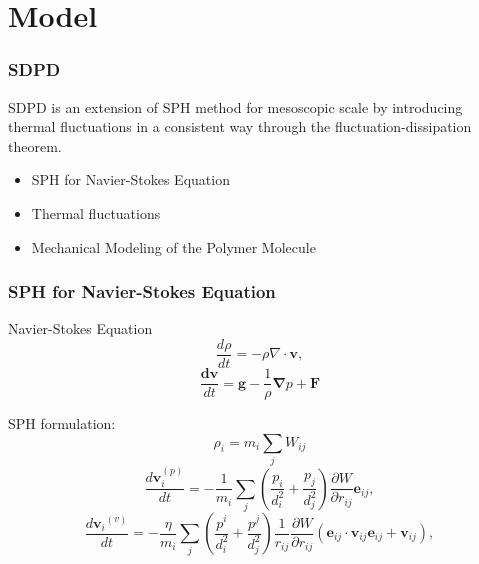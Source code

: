 \section[Model]{Model}
\begin{frame}
  \frametitle{SDPD}
   \begin{block}{}
   SDPD is an extension of SPH method for mesoscopic scale by introducing thermal fluctuations in a consistent
way through the fluctuation-dissipation theorem.
  \end{block}
 \begin{itemize}
  \item \alert{SPH for Navier-Stokes Equation}
  \item \alert{Thermal fluctuations} %
  \item \alert{Mechanical Modeling of the Polymer Molecule}%
  \end{itemize}

\end{frame}
\begin{frame}
  \frametitle{SPH for Navier-Stokes Equation}
Navier-Stokes Equation
\begin{equation}\label{equ:masscon}
 \frac{d\rho}{dt}=-\rho\nabla\cdot\mathbf{v},
\end{equation}
\begin{equation}\label{equ:momecon}
 \frac{\mathbf{dv}}{dt}=\mathbf{g}-\frac{1}{\rho}\mathbf{\nabla}p+\mathbf{F}
\end{equation}

SPH formulation:
  \begin{equation}\label{equ:rho}
 \rho_i=m_i \sum_j W_{ij}
\end{equation}
  \begin{equation}\label{equ:momeevo}
 \frac{d\mathbf{v}_{i}^{(p)}}{dt}=-\frac{1}{m_i}\sum_j\left(\frac{p_i}{d_{i}^{2}}+\frac{p_j}{d_{j}^{2}}\right)\frac{\partial W}{\partial r_{ij}}\mathbf{e}_{ij},
\end{equation}
\begin{equation}\label{equ:acceleration}
 \frac{d\mathbf{v}{_i}^{(v)}}{dt}=-\frac{\eta}{m_i}\sum_j\left(\frac{p^i}{d_{i}^{2}}+\frac{p^j}{d_{j}^{2}}\right)\frac{1}{r_{ij}}\frac{\partial W}{\partial r_{ij}}(\mathbf{e}_{ij}\cdot\mathbf{v}_{ij}\mathbf{e}_{ij}+\mathbf{v}_{ij}),
\end{equation}
\end{frame}

